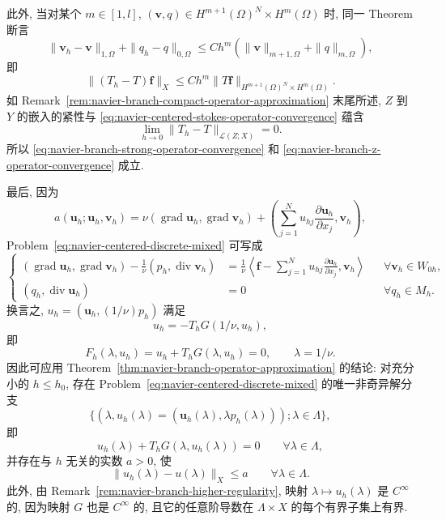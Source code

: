 \begin{Proof}
此外, 当对某个 $m\in[1,l]$,
$(\boldsymbol v,q)\in H^{m+1}(\Omega)^N\times H^m(\Omega)$ 时,
同一 Theorem 断言
\begin{equation}\label{eq:navier-centered-stokes-hm-error}
\|\boldsymbol v_h-\boldsymbol v\|_{1,\Omega}
+\|q_h-q\|_{0,\Omega}
\leq Ch^m\left(
\|\boldsymbol v\|_{m+1,\Omega}+\|q\|_{m,\Omega}
\right),
\end{equation}
即
\[
\|(T_h-T)\boldsymbol f\|_X
\leq Ch^m\|T\boldsymbol f\|_{H^{m+1}(\Omega)^N\times H^m(\Omega)}.
\]
如 Remark~\ref{rem:navier-branch-compact-operator-approximation} 末尾所述,
$Z$ 到 $Y$ 的嵌入的紧性与
\eqref{eq:navier-centered-stokes-operator-convergence} 蕴含
\[
\lim_{h\to0}\|T_h-T\|_{\mathcal L(Z;X)}=0.
\]
所以 \eqref{eq:navier-branch-strong-operator-convergence} 和
\eqref{eq:navier-branch-z-operator-convergence} 成立.

最后, 因为
\[
a(\boldsymbol u_h;\boldsymbol u_h,\boldsymbol v_h)
=\nu(\operatorname{grad}\boldsymbol u_h,\operatorname{grad}\boldsymbol v_h)
+\left(\sum_{j=1}^{N}u_{hj}
\frac{\partial\boldsymbol u_h}{\partial x_j},\boldsymbol v_h\right),
\]
Problem~\eqref{eq:navier-centered-discrete-mixed} 可写成
\[
\left\{
\begin{aligned}
(\operatorname{grad}\boldsymbol u_h,\operatorname{grad}\boldsymbol v_h)
-\frac1\nu(p_h,\operatorname{div}\boldsymbol v_h)
&=\frac1\nu\left\langle
\boldsymbol f-\sum_{j=1}^{N}u_{hj}
\frac{\partial\boldsymbol u_h}{\partial x_j},\boldsymbol v_h
\right\rangle
&&\forall\boldsymbol v_h\in W_{0h},\\
(q_h,\operatorname{div}\boldsymbol u_h)&=0
&&\forall q_h\in M_h.
\end{aligned}
\right.
\]
换言之, $u_h=(\boldsymbol u_h,(1/\nu)p_h)$ 满足
\[
u_h=-T_hG(1/\nu,u_h),
\]
即
\[
F_h(\lambda,u_h)=u_h+T_hG(\lambda,u_h)=0,
\qquad\lambda=1/\nu.
\]
因此可应用 Theorem~\ref{thm:navier-branch-operator-approximation} 的结论:
对充分小的 $h\leq h_0$, 存在
Problem~\eqref{eq:navier-centered-discrete-mixed} 的唯一非奇异解分支
\[
\{(\lambda,u_h(\lambda)
=(\boldsymbol u_h(\lambda),\lambda p_h(\lambda)));
\lambda\in\Lambda\},
\]
即
\[
u_h(\lambda)+T_hG(\lambda,u_h(\lambda))=0
\qquad\forall\lambda\in\Lambda,
\]
并存在与 $h$ 无关的实数 $a>0$, 使
\[
\|u_h(\lambda)-u(\lambda)\|_X\leq a
\qquad\forall\lambda\in\Lambda.
\]
此外, 由 Remark~\ref{rem:navier-branch-higher-regularity}, 映射
$\lambda\mapsto u_h(\lambda)$ 是 $C^\infty$ 的, 因为映射 $G$ 也是
$C^\infty$ 的, 且它的任意阶导数在 $\Lambda\times X$ 的每个有界子集上有界.


\end{Proof}
